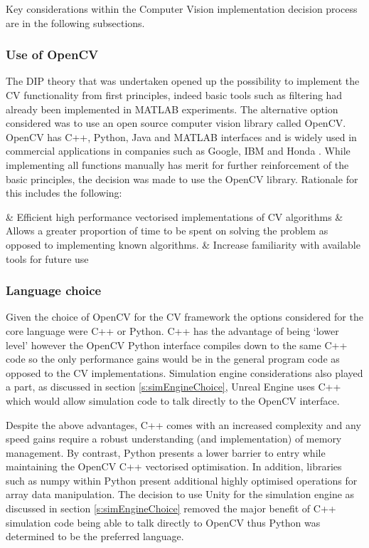 \documentclass[]{aiaa-tc}%
\begin{document}
Key considerations within the Computer Vision implementation decision process are in the following subsections.

\subsubsection{Use of OpenCV}\label{s:openCV}

The DIP theory that was undertaken opened up the possibility to implement the CV functionality from first principles, indeed basic tools such as filtering had already been implemented in MATLAB experiments. The alternative option considered was to use an open source computer vision library called OpenCV. OpenCV has C++, Python, Java and MATLAB interfaces and is widely used in commercial applications in companies such as Google, IBM and Honda \citep{opencvWebsite}. While implementing all functions manually has merit for further reinforcement of the basic principles, the decision was made to use the OpenCV library. Rationale for this includes the following: 

\begin{easylist}[itemize]
	& Efficient high performance vectorised implementations of CV algorithms
	& Allows a greater proportion of time to be spent on solving the problem as opposed to implementing known algorithms.
	& Increase familiarity with available tools for future use
\end{easylist}

\subsubsection{Language choice} \label{s:pythonVc}

Given the choice of OpenCV for the CV framework the options considered for the core language were C++ or Python. C++ has the advantage of being `lower level' however the OpenCV Python interface compiles down to the same C++ code so the only performance gains would be in the general program code as opposed to the CV implementations. Simulation engine considerations also played a part, as discussed in section \ref{s:simEngineChoice}, Unreal Engine uses C++ which would allow simulation code to talk directly to the OpenCV interface.

Despite the above advantages, C++ comes with an increased complexity and any speed gains require a robust understanding (and implementation) of memory management. By contrast, Python presents a lower barrier to entry while maintaining the OpenCV C++ vectorised optimisation. In addition, libraries such as numpy within Python present additional highly optimised operations for array data manipulation. The decision to use Unity for the simulation engine as discussed in section \ref{s:simEngineChoice} removed the major benefit of C++ simulation code being able to talk directly to OpenCV thus Python was determined to be the preferred language.
\end{document}
